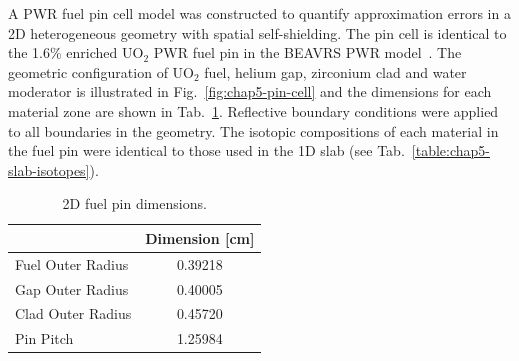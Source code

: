 A \ac{PWR} fuel pin cell model was constructed to quantify approximation errors in a 2D heterogeneous geometry with spatial self-shielding. The pin cell is identical to the 1.6\% enriched UO$_2$ \ac{PWR} fuel pin in the \ac{BEAVRS} \ac{PWR} model~\cite{horelik2013beavrs}. The geometric configuration of UO$_2$ fuel, helium gap, zirconium clad and water moderator is illustrated in Fig.~\ref{fig:chap5-pin-cell} and the dimensions for each material zone are shown in Tab.~\ref{table:chap5-pin-dimensions}. Reflective boundary conditions were applied to all boundaries in the geometry. The isotopic compositions of each material in the fuel pin were identical to those used in the 1D slab (see Tab.~\ref{table:chap5-slab-isotopes}). 

\begin{table}[H]
  \centering
  \caption[2D fuel pin dimensions]{2D fuel pin dimensions.}
  \label{table:chap5-pin-dimensions} 
  \vspace{6pt}
  \begin{tabular}{l c}
  \toprule
  \rowcolor{lightgray}
  \multicolumn{1}{c}{\cellcolor{lightgray} {\bf Material}} &
  {\bf Dimension [cm]} \\
  \midrule
  Fuel Outer Radius &     0.39218 \\
  Gap Outer Radius &      0.40005 \\
  Clad Outer Radius &     0.45720 \\
  Pin Pitch &             1.25984 \\
  \bottomrule
\end{tabular}
\end{table}

